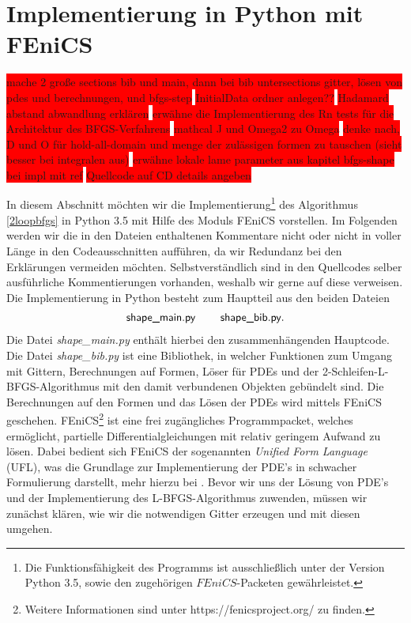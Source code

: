 
\section{Implementierung in Python mit FEniCS}\label{Chapter_implementation}
\colorbox{red}{mache 2 große sections bib und main, dann bei bib untersections gitter, lösen von pdes und berechnungen, und bfgs-step} \newline
\colorbox{red}{InitialData ordner anlegen??} \newline
\colorbox{red}{Hadamard abstand abwandlung erklären} \newline
\colorbox{red}{erwähne die Implementierung des Rn tests für die Architektur des BFGS-Verfahrens}\newline
\colorbox{red}{mathcal J und Omega2 zu Omega}\newline
\colorbox{red}{denke nach, D und O für hold-all-domain und menge der zulässigen formen zu tauschen (sieht besser bei integralen aus)}\newline
\colorbox{red}{erwähne lokale lame parameter aus kapitel bfgs-shape bei impl mit ref}
\colorbox{red}{Quellcode auf CD details angeben}


In diesem Abschnitt möchten wir die Implementierung\footnote{Die Funktionsfähigkeit des Programms ist ausschließlich unter der Version Python 3.5, sowie den zugehörigen $FEniCS$-Packeten gewährleistet.} des Algorithmus \ref{2loopbfgs} in Python 3.5 mit Hilfe des Moduls FEniCS vorstellen. Im Folgenden werden wir die in den Dateien enthaltenen Kommentare nicht oder nicht in voller Länge in den Codeausschnitten aufführen, da wir Redundanz bei den Erklärungen vermeiden möchten. Selbstverständlich sind in den Quellcodes selber ausführliche Kommentierungen vorhanden, weshalb wir gerne auf diese verweisen. Die Implementierung in Python besteht zum Hauptteil aus den beiden Dateien
\begin{align*}
\textsf{shape\_main.py} \hspace{0.8cm} \textsf{shape\_bib.py}.
\end{align*}
Die Datei \textit{shape\_main.py} enthält hierbei den zusammenhängenden Hauptcode. Die Datei \textit{shape\_bib.py} ist eine Bibliothek, in welcher Funktionen zum Umgang mit Gittern, Berechnungen auf Formen, Löser für PDEs und der 2-Schleifen-L-BFGS-Algorithmus mit den damit verbundenen Objekten gebündelt sind. Die Berechnungen auf den Formen und das Lösen der PDEs wird mittels FEniCS geschehen.
FEniCS\footnote{Weitere Informationen sind unter https://fenicsproject.org/ zu finden.} ist eine frei zugängliches Programmpacket, welches ermöglicht, partielle Differentialgleichungen mit relativ geringem Aufwand zu lösen. Dabei bedient sich FEniCS der sogenannten \textit{Unified Form Language} (UFL), was die Grundlage zur Implementierung der PDE's in schwacher Formulierung darstellt, mehr hierzu bei \cite{Unifiedformlanguage}. 
Bevor wir uns der Lösung von PDE's und der Implementierung des L-BFGS-Algorithmus zuwenden, müssen wir zunächst klären, wie wir die notwendigen Gitter erzeugen und mit diesen umgehen.

